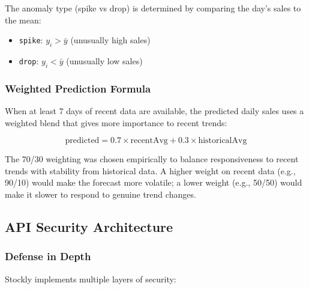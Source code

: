\documentclass[12pt,onecolumn]{IEEEtran}
\begin{document}
The anomaly type (spike vs drop) is determined by comparing the day's sales to the mean:
\begin{itemize}[leftmargin=1.5em]
  \item \texttt{spike}: $y_i > \bar{y}$ (unusually high sales)
  \item \texttt{drop}: $y_i < \bar{y}$ (unusually low sales)
\end{itemize}

\subsubsection{Weighted Prediction Formula}

When at least 7 days of recent data are available, the predicted daily sales uses a weighted blend that gives more importance to recent trends:

\[
\text{predicted} = 0.7 \times \text{recentAvg} + 0.3 \times \text{historicalAvg}
\]

The 70/30 weighting was chosen empirically to balance responsiveness to recent trends with stability from historical data. A higher weight on recent data (e.g., 90/10) would make the forecast more volatile; a lower weight (e.g., 50/50) would make it slower to respond to genuine trend changes.

\subsection{API Security Architecture}

\subsubsection{Defense in Depth}

Stockly implements multiple layers of security:
\end{document}
